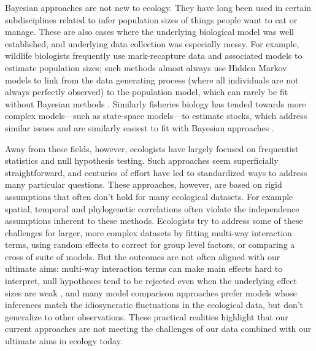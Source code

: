 
Bayesian approaches are not new to ecology. They have long been used in certain subdisciplines related to infer population sizes of things people want to eat or manage. These are also cases where the underlying biological model was well established, and underlying data collection was especially messy. For example, wildlife biologists frequently use mark-recapture data and associated models to estimate population sizes; such methods almost always use Hidden Markov models to link from the data generating process (where all individuals are not always perfectly observed) to the population model, which can rarely be fit without Bayesian methods \citep{muthuku2008,zheng2007,strinella2020potential}. Similarly fisheries biology has tended towards more complex models---such as state-space models---to estimate stocks, which address similar issues and are similarly easiest to fit with Bayesian approaches \citep{trijoulet2018,millar2000}. %

Away from these fields, however, ecologists have largely focused on frequentist statistics and null hypothesis testing. Such approaches seem superficially straightforward, and centuries of effort have led to standardized ways to address many particular questions. These approaches, however, are based on rigid assumptions that often don't hold for many ecological datasets.  For example spatial, temporal and phylogenetic correlations often violate the independence assumptions inherent to these methods. %
Ecologists try to address some of these challenges for larger, more complex datasets by fitting multi-way interaction terms, using random effects to correct for group level factors, or comparing a cross of suite of models. But the outcomes are not often aligned with our ultimate aims:  multi-way interaction terms can make main effects hard to interpret, null hypotheses tend to be rejected even when the underlying effect sizes are weak \citep{gelmanhill,muff2022rewriting}, and many model comparison approaches prefer models whose inferences match the idiosyncratic fluctuations in the ecological data, but don’t generalize to other observations. These practical realities highlight that our current approaches are not meeting the challenges of our data combined with our ultimate aims in ecology today.



